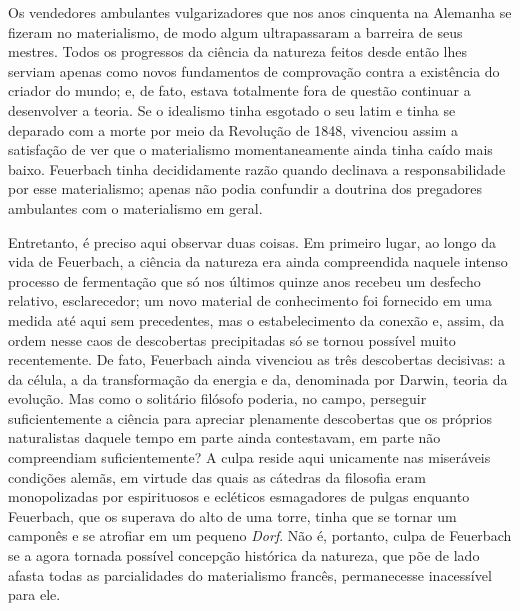 Os vendedores ambulantes vulgarizadores que nos anos cinquenta na %
Alemanha se fizeram no materialismo, de modo algum ultrapassaram a
barreira de seus mestres. Todos os progressos da ciência da natureza
feitos desde então lhes serviam apenas como novos fundamentos de
comprovação contra a existência do criador do mundo; e, de fato, estava
totalmente fora de questão continuar a desenvolver a teoria. Se o
idealismo tinha esgotado o seu latim e tinha se deparado com a morte por %
meio da Revolução de 1848, vivenciou assim a satisfação de ver que o
materialismo momentaneamente ainda tinha caído mais %
baixo. Feuerbach tinha
decididamente razão quando declinava a responsabilidade por esse
materialismo; apenas não podia confundir a doutrina dos pregadores %
ambulantes com o materialismo em geral.

Entretanto, é preciso aqui observar duas coisas. Em primeiro lugar, ao
longo da vida
de Feuerbach,
a ciência da natureza era ainda compreendida naquele intenso processo de
fermentação que só nos últimos quinze anos recebeu um desfecho relativo, %
esclarecedor; um novo material de conhecimento foi fornecido em uma
medida até aqui sem precedentes, mas o estabelecimento
da conexão e, assim, da ordem nesse caos de 
descobertas precipitadas só se tornou possível muito recentemente. De
fato,
 Feuerbach ainda
vivenciou as três descobertas decisivas: a da célula, a da
transformação da energia e da, denominada %
por Darwin,
teoria da evolução. Mas como o solitário
filósofo poderia, no campo, perseguir suficientemente a ciência para %
apreciar plenamente descobertas que os próprios naturalistas daquele
tempo em parte ainda contestavam, em parte não compreendiam %
suficientemente? A culpa reside aqui unicamente nas miseráveis condições
alemãs, em virtude das quais as cátedras da filosofia eram monopolizadas %
por espirituosos e ecléticos esmagadores de pulgas
enquanto Feuerbach,
que os superava do alto de uma torre, tinha que se tornar um camponês e
se atrofiar em um pequeno \emph{Dorf}. Não é, portanto, culpa %
de Feuerbach
se a agora tornada possível concepção histórica da natureza, que põe de %
lado \textbar{} afasta \textbar{} todas as parcialidades do materialismo francês,
permanecesse inacessível para ele.

